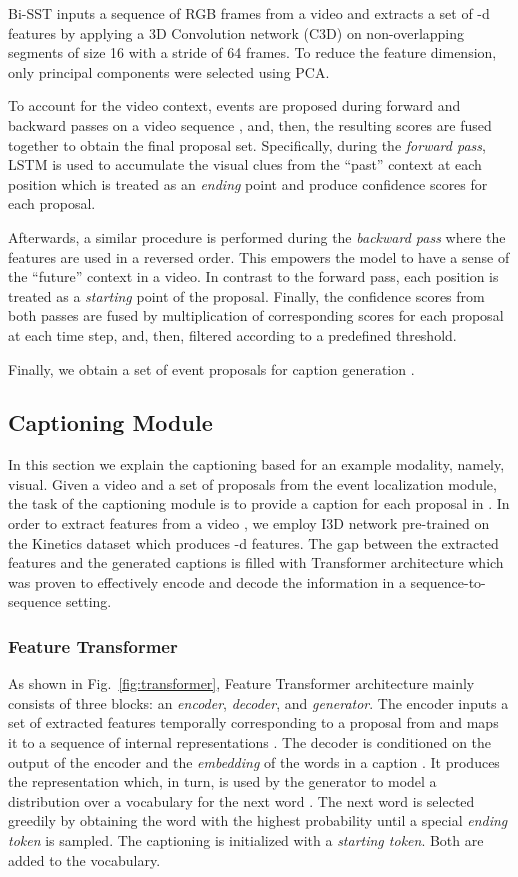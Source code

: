 \documentclass[10pt,twocolumn,letterpaper]{article}
\begin{document}
Bi-SST inputs a sequence of  RGB frames from a video  and extracts a set of -d features  by applying a 3D Convolution network (C3D) on non-overlapping segments of size 16 with a stride of 64 frames. To reduce the feature dimension, only  principal components were selected using PCA.

To account for the video context, events are proposed during forward and backward passes on a video sequence , and, then, the resulting scores are fused together to obtain the final proposal set. Specifically, during the \textit{forward pass}, LSTM is used to accumulate the visual clues from the ``past'' context at each position  which is treated as an \textit{ending} point and produce confidence scores for each proposal.

Afterwards, a similar procedure is performed during the \textit{backward pass} where the features  are used in a reversed order. This empowers the model to have a sense of the ``future'' context in a video. In contrast to the forward pass, each position is treated as a \textit{starting} point of the proposal. Finally, the confidence scores from both passes are fused by multiplication of corresponding scores for each proposal at each time step, and, then, filtered according to a predefined threshold.

Finally, we obtain a set of  event proposals for caption generation .

\subsection{Captioning Module}
In this section we explain the captioning based for an example modality, namely, visual. Given a video  and a set of proposals  from the event localization module, the task of the captioning module is to provide a caption for each proposal in . In order to extract features from a video , we employ I3D network \cite{Carreira2017} pre-trained on the Kinetics dataset which produces -d features. The gap between the extracted features and the generated captions is filled with Transformer \cite{Vaswani2017} architecture which was proven to effectively encode and decode the information in a sequence-to-sequence setting. 

\subsubsection{Feature Transformer}
As shown in Fig.~\ref{fig:transformer}, Feature Transformer architecture mainly consists of three blocks: an \textit{encoder}, \textit{decoder}, and \textit{generator}. The encoder inputs a set of extracted features  temporally corresponding to a proposal  from  and maps it to a sequence of internal representations . The decoder is conditioned on the output of the encoder  and the \textit{embedding}  of the words in a caption . It produces the representation  which, in turn, is used by the generator to model a distribution over a vocabulary for the next word . The next word is selected greedily by obtaining the word with the highest probability until a special \textit{ending token} is sampled. The captioning is initialized with a \textit{starting token}. Both are added to the vocabulary.
\end{document}
